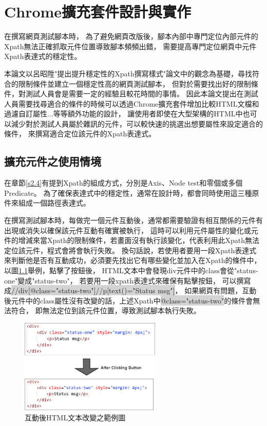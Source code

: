 \chapter{Chrome擴充套件設計與實作}
\indent
在撰寫網頁測試腳本時，
為了避免網頁改版後，腳本內部中專門定位內部元件的Xpath無法正確抓取元件位置導致腳本頻頻出錯，
需要提高專門定位網頁中元件Xpath表達式的穩定性。

本論文以呂昭陞"提出提升穩定性的Xpath撰寫樣式"論文中的觀念為基礎，尋找符合的限制條件並建立一個穩定性高的網頁測試腳本，
但對於需要找出好的限制條件，對測試人員會是需要一定的經驗且較花時間的事情。
因此本論文提出在測試人員需要找尋適合的條件的時候可以透過Chrome擴充套件增加比較HTML文檔和過濾自訂屬性...等等額外功能的設計，
讓使用者即使在大型架構的HTML中也可以減少對於測試人員屬於雜訊的元件，可以較快速的挑選出想要屬性來設定適合的條件，
來撰寫適合定位該元件的Xpath表達式。

\section{擴充元件之使用情境}\label{s3.1}

在章節\ref{s2.4}有提到Xpath的組成方式，分別是Axis、Node test和零個或多個Predicate。
為了確保表達式中的穩定性，通常在設計時，都會同時使用這三種原件來組成一個路徑表達式。

在撰寫測試腳本時，每做完一個元件互動後，通常都需要驗證有相互關係的元件有出現或消失以確保該元件互動有確實被執行，
這時可以利用元件屬性的變化或元件的增減來當Xpath的限制條件，若畫面沒有執行該變化，代表利用此Xpath無法定位該元件，程式會將會執行失敗。
換句話說，若使用者要用一段Xpath表達式來判斷他是否有互動成功，必須要先找出它有哪些變化並加入在Xpath的條件中，
以圖\ref{f3.1}舉例，點擊了按鈕後，
HTML文本中會發現div元件中的class會從"status-one"變成"status-two"，
若要用一段xpath表達式來確保有點擊按鈕，
可以撰寫成\colorbox{lightgray}{//div[@class="status-two"]//p[text()="Status msg"]}，
如果網頁有問題，互動後元件中的class屬性沒有改變的話，上述Xpath中\colorbox{lightgray}{@class="status-two"}的條件會無法符合，
即無法定位到該元件位置，導致測試腳本執行失敗。

\begin{figure}[H]
    \centering
    \includegraphics[width=0.6\textwidth]{picture/ch3-html-after-change.png}
    \caption{互動後HTML文本改變之範例圖}
    \label{f3.1}
\end{figure}

